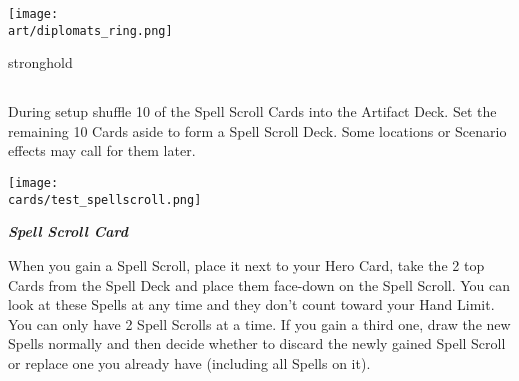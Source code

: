 \begin{multicols*}{2}
\begin{center}
  \vspace*{\fill}
  {\texttt{[image: \\art/diplomats\_ring.png]}}
  \vspace*{\fill}
\end{center}

\pagebreak

\begin{expansion}{stronghold}
\subsection*{}

During setup shuffle 10 of the Spell Scroll Cards into the Artifact Deck.
Set the remaining 10 Cards aside to form a Spell Scroll Deck.
Some locations or Scenario effects may call for them later.
\vspace*{1em}

{
    \medskip
    \centering
    \texttt{[image: \\cards/test\_spellscroll.png]}\\
    \medskip
    \footnotesize
    \begin{center}
         \textbf{\textit{\textcolor{darkcandyapplered}{Spell Scroll Card}}}
    \end{center}
}

\vspace*{1em}
When you gain a Spell Scroll, place it next to your Hero Card, take the 2 top Cards from the Spell Deck and place them face-down on the Spell Scroll.
You can look at these Spells at any time and they don't count toward your Hand  Limit.
You can only have 2 Spell Scrolls at a time.
If you gain a third one, draw the new Spells normally and then decide whether to discard the newly gained Spell Scroll or replace one you already have (including all Spells on it).

\medskip


\end{expansion}
\end{multicols*}
